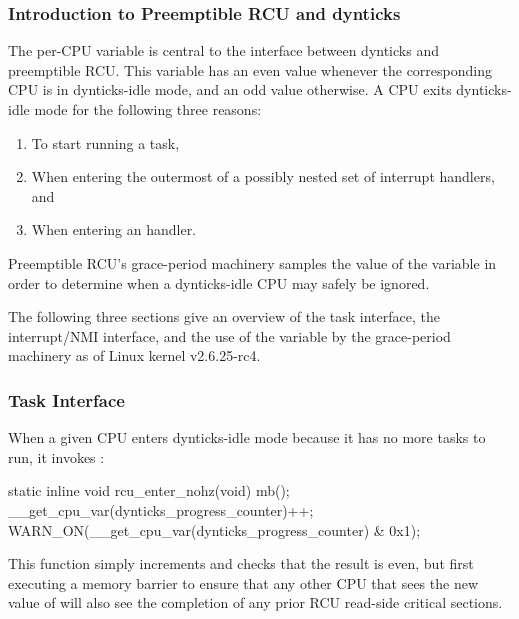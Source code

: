 \subsubsection{Introduction to Preemptible RCU and dynticks}
\label{sec:formal:Introduction to Preemptible RCU and dynticks}

The per-CPU  variable is
central to the interface between dynticks and preemptible RCU\@.
This variable has an even value whenever the corresponding CPU
is in dynticks-idle mode, and an odd value otherwise.
A CPU exits dynticks-idle mode for the following three reasons:

\begin{enumerate}
\item	To start running a task,
\item	When entering the outermost of a possibly nested set of interrupt
	handlers, and
\item	When entering an  handler.
\end{enumerate}

Preemptible RCU's grace-period machinery samples the value of
the  variable in order to
determine when a dynticks-idle CPU may safely be ignored.

The following three sections give an overview of the task
interface, the interrupt/NMI interface, and the use of
the  variable by the
grace-period machinery as of Linux kernel v2.6.25-rc4.

\subsubsection{Task Interface}
\label{sec:formal:Task Interface}

When a given CPU enters dynticks-idle mode because it has no more
tasks to run, it invokes :

\begin{VerbatimN}
static inline void rcu_enter_nohz(void)
{
	mb();
	__get_cpu_var(dynticks_progress_counter)++;
	WARN_ON(__get_cpu_var(dynticks_progress_counter) &
	        0x1);
}
\end{VerbatimN}

This function simply increments  and
checks that the result is even, but first executing a memory barrier
to ensure that any other CPU that sees the new value of
 will also see the completion
of any prior RCU read-side critical sections.

